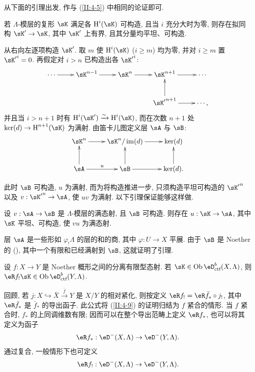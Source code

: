 从下面的引理出发, 作与 (\ref{II:4-5}) 中相同的论证即可.

\begin{lemma_}\label{II:4-7}
若 $\Lambda$-模层的复形 $\sK$ 满足各 $\h^i(\sK)$ 可构造, 且当 $i$ 充分大时为零, 则存在拟同构 $\sK'\to \sK$, 其中 $\sK'$ 上有界, 且其分量均平坦、可构造.
\end{lemma_}

从右向左逐项构造 $\sK'$. 取 $m$ 使 $\h^i(\sK)$ ($i\geqslant m$) 均为零, 并对 $i\geqslant m$ 置 ${\sK'}^i = 0$. 再假定对 $i>n$ 已构造出各 ${\sK'}^i$:
\[\xymatrix{
  \cdots \ar[r]
    & \sK^{n-1} \ar[r]
    & \sK^n \ar[r]
    & \sK^{n+1} \ar[r]
    & \cdots \\
  & & & {\sK'}^{n+1} \ar[u] \ar[r]
    & \cdots \text{,}
}\]
并且当 $i>n+1$ 时有 $\h^i(\sK')\iso \h^i(\sK)$, 而在次数 $n+1$ 处 $\ker(d)\to\h^{n+1}(\sK)$ 为满射. 由笛卡儿图定义层 $\sA$ 与 $\sB$:
\[\xymatrix{
  \sK^n \ar[r]
    & \sK^n/\im(d) \ar[r]
    & \ker(d) \\
  \sA \ar[u] \ar[r]^u
    & \sB \ar[u]\ar[r]
    & \ker(d) \ar[u] \text{.}
}\]

此时 $\sB$ 可构造, $u$ 为满射, 而为将构造推进一步, 只须构造平坦可构造的 ${\sK'}^n$ 以及 $v:{\sK'}^n\to \sA$, 使 $u v$ 为满射. 以下引理保证能够这样做.

\begin{lemma_}\label{II:4-8}
设 $v:\sA\to \sB$ 是 $\Lambda$-模层的满态射, 且 $\sB$ 可构造. 则存在 $u:\sK\to \sA$, 其中 $\sK$ 平坦、可构造, 使 $v u$ 为满态射.
\end{lemma_}

层 $\sA$ 是一些形如 $\varphi_! \Lambda$ 的层的和的商, 其中 $\varphi:U\to X$ 平展. 由于 $\sB$ 是 Noether 的 (\cite[IX.2.10]{sga4}), 其中一个有限和已经满射到 $\sB$, 这就证明了引理.

\begin{theorem_}\label{II:4-9}
设 $f:X\to Y$ 是 Noether 概形之间的分离有限型态射. 若 $\sK\in\ob\eD_\textnormal{ctf}^b(X,\Lambda)$, 则 $\eR f_!\sK\in \ob\eD_\textnormal{ctf}^b(Y,\Lambda)$.
\end{theorem_}

回顾, 若 $j:X\hookrightarrow \bar X \xrightarrow{\bar f} Y$ 是 $X/Y$ 的相对紧化, 则按定义 $\eR f_! = \eR \bar f_* \circ j_!$, 其中 $\eR \bar f_*$ 是 $\bar f_*$ 的导出函子. 此公式将 (\ref{II:4-9}) 的证明归结为 $f$ 紧合的情形. 当 $f$ 紧合时, $f_*$ 的上同调维数有限; 因而可以在整个导出范畴上定义 $\eR f_*$, 也可以将其定义为函子
\[
  \eR f_* : \eD^-(X,\Lambda) \to \eD^-(Y,\Lambda) \text{.}
\]
通过复合, 一般情形下也可定义
\[
  \eR f_! : \eD^-(X,\Lambda) \to \eD^-(Y,\Lambda) \text{.}
\]

